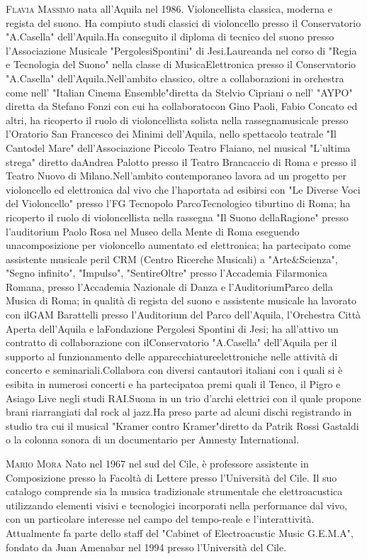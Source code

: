 \documentclass[9pt, twoside, a5paper]{extreport}
\newcommand{\biografia}[2]{%
\noindent \textsc{#1} %
#2 %
\medskip
}%
\begin{document}
\begin{multicols}{2}
\biografia{Flavia Massimo}{nata all'Aquila nel 1986. Violoncellista classica, moderna e regista del suono. Ha compiuto studi classici di violoncello
presso il Conservatorio "A.Casella" dell'Aquila.Ha conseguito il diploma di tecnico del suono presso l'Associazione
Musicale "PergolesiSpontini" di Jesi.Laureanda nel corso di "Regia e Tecnologia del Suono" nella classe di
MusicaElettronica presso il Conservatorio "A.Casella" dell'Aquila.Nell'ambito classico, oltre a collaborazioni in
orchestra come nell' "Italian Cinema Ensemble"diretta da Stelvio Cipriani o nell' "AYPO" diretta da Stefano
Fonzi con cui ha collaboratocon Gino Paoli, Fabio Concato ed altri, ha ricoperto il ruolo di violoncellista solista
nella rassegnamusicale presso l'Oratorio San Francesco dei Minimi dell'Aquila, nello spettacolo teatrale "Il Cantodel
Mare" dell'Associazione Piccolo Teatro Flaiano, nel musical "L'ultima strega" diretto daAndrea Palotto presso il
Teatro Brancaccio di Roma e presso il Teatro Nuovo di Milano.Nell'ambito contemporaneo lavora ad un progetto per
violoncello ed elettronica dal vivo che l'haportata ad esibirsi con "Le Diverse Voci del Violoncello" presso l'FG
Tecnopolo ParcoTecnologico tiburtino di Roma; ha ricoperto il ruolo di violoncellista nella rassegna "Il Suono
dellaRagione" presso l'auditorium Paolo Rosa nel Museo della Mente di Roma eseguendo unacomposizione per violoncello
aumentato ed elettronica; ha partecipato come assistente musicale peril CRM (Centro Ricerche Musicali) a
"Arte\&Scienza", "Segno infinito", "Impulso", "SentireOltre" presso l'Accademia
Filarmonica Romana, presso l'Accademia Nazionale di Danza e l'AuditoriumParco della Musica di Roma; in qualità di
regista del suono e assistente musicale ha lavorato con ilGAM Barattelli presso l'Auditorium del Parco dell'Aquila,
l'Orchestra Città Aperta dell'Aquila e laFondazione Pergolesi Spontini di Jesi; ha all'attivo un contratto di
collaborazione con ilConservatorio "A.Casella" dell'Aquila per il supporto al funzionamento delle
apparecchiatureelettroniche nelle attività di concerto e seminariali.Collabora con diversi cantautori italiani con i
quali si è esibita in numerosi concerti e ha partecipatoa premi quali il Tenco, il Pigro e Asiago Live negli studi
RAI.Suona in un trio d'archi elettrici con il quale propone brani riarrangiati dal rock al jazz.Ha preso parte ad
alcuni dischi registrando in studio tra cui il musical "Kramer contro Kramer"diretto da Patrik Rossi Gastaldi o la
colonna sonora di un documentario per Amnesty International.}

\biografia{Mario Mora}{Nato nel 1967 nel sud del Cile, è professore assistente in Composizione presso la Facoltà di Lettere presso l'Università del Cile. Il suo catalogo comprende sia la musica tradizionale strumentale che elettroacustica utilizzando elementi visivi e tecnologici incorporati nella performance dal vivo, con un particolare interesse nel campo del tempo-reale e l'interattività. Attualmente fa parte dello staff del "Cabinet of Electroacustic Music G.E.M.A", fondato da Juan Amenabar nel 1994 presso l'Università del Cile.}


\end{multicols}
\end{document}
